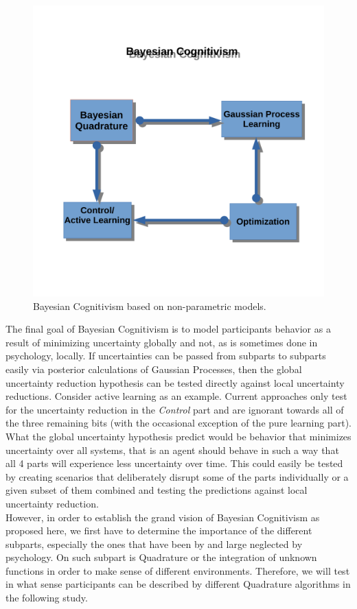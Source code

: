 \documentclass[oneside, 11pt]{book}
\begin{document}
\FloatBarrier
\begin{figure}
\caption{Bayesian Cognitivism based on non-parametric models.}
\label{bayescog}
  \centering
    \includegraphics[scale=0.6]{bayescog.pdf}
\end{figure}
\FloatBarrier
The final goal of Bayesian Cognitivism is to model participants behavior as a result of minimizing uncertainty globally and not, as is sometimes done in psychology, locally. If uncertainties can be passed from subparts to subparts easily via posterior calculations of Gaussian Processes, then the global uncertainty reduction hypothesis can be tested directly against local uncertainty reductions. Consider active learning as an example. Current approaches only test for the uncertainty reduction in the \emph{Control} part and are ignorant towards all of the three remaining bits (with the occasional exception of the pure learning part). What the global uncertainty hypothesis predict would be behavior that minimizes uncertainty over all systems, that is an agent should behave in such a way that all 4 parts will experience less uncertainty over time. This could easily be tested by creating scenarios that deliberately disrupt some of the parts individually or a given subset of them combined and testing the predictions against local uncertainty reduction.\medskip\\
However, in order to establish the grand vision of Bayesian Cognitivism as proposed here, we first have to determine the importance of the different subparts, especially the ones that have been by and large neglected by psychology. On such subpart is Quadrature or the integration of unknown functions in order to make sense of different environments. Therefore, we will test in what sense participants can be described by different Quadrature algorithms in the following study.
\end{document}
